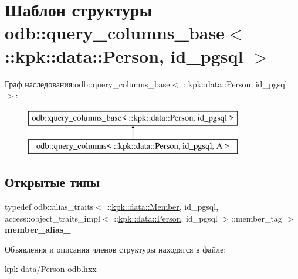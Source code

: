 \hypertarget{structodb_1_1query__columns__base_3_01_1_1kpk_1_1data_1_1_person_00_01id__pgsql_01_4}{}\section{Шаблон структуры odb\+:\+:query\+\_\+columns\+\_\+base$<$ \+:\+:kpk\+:\+:data\+:\+:Person, id\+\_\+pgsql $>$}
\label{structodb_1_1query__columns__base_3_01_1_1kpk_1_1data_1_1_person_00_01id__pgsql_01_4}
Граф наследования\+:odb\+:\+:query\+\_\+columns\+\_\+base$<$ \+:\+:kpk\+:\+:data\+:\+:Person, id\+\_\+pgsql $>$\+:\begin{figure}[H]
\begin{center}
\leavevmode
\includegraphics[height=2.000000cm]{structodb_1_1query__columns__base_3_01_1_1kpk_1_1data_1_1_person_00_01id__pgsql_01_4}
\end{center}
\end{figure}
\subsection*{Открытые типы}
\begin{DoxyCompactItemize}
\item 
typedef odb\+::alias\+\_\+traits$<$ \+::\hyperlink{classkpk_1_1data_1_1_member}{kpk\+::data\+::\+Member}, id\+\_\+pgsql, access\+::object\+\_\+traits\+\_\+impl$<$ \+::\hyperlink{classkpk_1_1data_1_1_person}{kpk\+::data\+::\+Person}, id\+\_\+pgsql $>$\+::member\+\_\+tag $>$ {\bfseries member\+\_\+alias\+\_\+}\hypertarget{structodb_1_1query__columns__base_3_01_1_1kpk_1_1data_1_1_person_00_01id__pgsql_01_4_ab95340302be05feb52f40b0486a16937}{}\label{structodb_1_1query__columns__base_3_01_1_1kpk_1_1data_1_1_person_00_01id__pgsql_01_4_ab95340302be05feb52f40b0486a16937}

\end{DoxyCompactItemize}


Объявления и описания членов структуры находятся в файле\+:\begin{DoxyCompactItemize}
\item 
kpk-\/data/Person-\/odb.\+hxx\end{DoxyCompactItemize}
